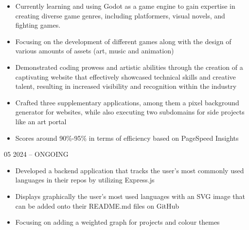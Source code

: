 \documentclass[10pt,a4paper,ragged2e,withhyper,darkmode]{altacv}
\begin{document}
\begin{paracol}{1}
            \begin{itemize}
                \item{Currently learning and using Godot as a game engine to gain expertise in creating diverse game genres, including platformers, visual novels, and fighting games.}
                \item{Focusing on the development of different games along with the design of various amounts of assets (art, music and animation)}
            \end{itemize}
            \begin{itemize}
                \item{Demonstrated coding prowess and artistic abilities through the creation of a captivating website that effectively showcased technical skills and creative talent, resulting in increased visibility and recognition within the industry}
                \item{Crafted three supplementary applications, among them a pixel background generator for websites, while also executing two subdomains for side projects like an art portal}
                \item{Scores around 90\%-95\% in terms of efficiency based on PageSpeed Insights}
            \end{itemize}
            \divider
            {05 2024 -- ONGOING}{}
            \begin{itemize}
                \item{Developed a backend application that tracks the user's most commonly used languages in their repos by utilizing Express.js}
                \item{Displays graphically the user's most used languages with an SVG image that can be added onto their README.md files on GitHub}
                \item{Focusing on adding a weighted graph for projects and colour themes}
            \end{itemize}
            \divider

\end{paracol}
\end{document}
